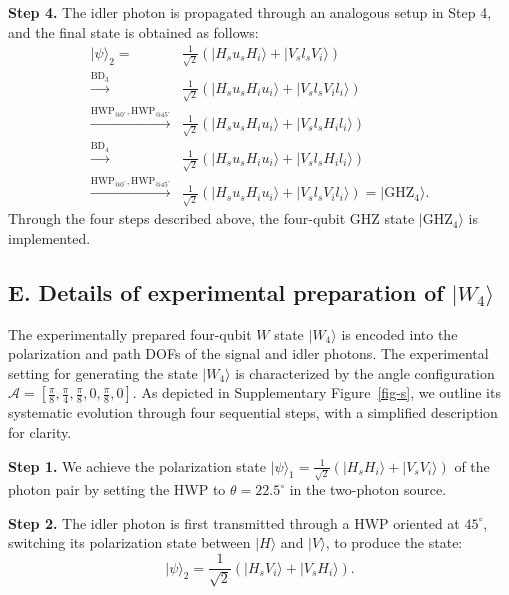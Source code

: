 \documentclass[prl,aps,notitlepage,superscriptaddress,showpacs,nofootinbib]{revtex4-2}
\newcommand{\red}[1]{{\color{red} #1}}
\begin{document}
\textbf{Step 4.} The idler photon is propagated through an analogous setup in Step 4, and the final state is obtained as follows:
\begin{equation}
	\begin{aligned}
		|\psi\rangle_2=&\frac{1}{\sqrt{2}}(|H_su_sH_i\rangle+|V_sl_sV_i\rangle)\\
		\xrightarrow{\text{BD$_3$}} &\frac{1}{\sqrt{2}}(|H_su_sH_iu_i\rangle+|V_sl_sV_il_i\rangle)\\
		\xrightarrow{\text{HWP}_{@0^\circ},\text{HWP}_{@45^\circ}} &\frac{1}{\sqrt{2}}(|H_su_sH_iu_i\rangle+|V_sl_sH_il_i\rangle)\\
		\xrightarrow{\text{BD$_4$}} &\frac{1}{\sqrt{2}}(|H_su_sH_iu_i\rangle+|V_sl_sH_il_i\rangle)\\
		\xrightarrow{\text{HWP}_{@0^\circ},\text{HWP}_{@45^\circ}} &\frac{1}{\sqrt{2}}(|H_su_sH_iu_i\rangle+|V_sl_sV_il_i\rangle)=|\text{GHZ}_4\rangle.
	\end{aligned}
\end{equation}
Through the four steps described above, the four-qubit GHZ state $|\text{GHZ}_4\rangle$ is implemented.


\subsection{E. Details of experimental preparation of  $|W_4\rangle$}

The experimentally prepared four-qubit $W$ state $|W_4\rangle$ is encoded into the polarization and path DOFs of the signal and idler photons. The experimental setting for generating the state $|W_4\rangle$ is characterized by the angle configuration  $\mathcal{A}=[\frac{\pi}{8},\frac{\pi}{4},\frac{\pi}{8},0,\frac{\pi}{8},0]$. As depicted in \red{Supplementary}  Figure~\ref{fig-s}, we outline its systematic evolution through four sequential steps, with a simplified description for clarity.

\textbf{Step 1.} We achieve the polarization state   $|\psi\rangle_1=\frac{1}{\sqrt{2}}(|H_sH_i\rangle+|V_sV_i\rangle)$ of the photon pair by setting the HWP to $\theta=22.5^\circ$ in the two-photon source. 

\textbf{Step 2.} The idler photon is first transmitted through a HWP oriented at $45^\circ$, switching its polarization state between $|H\rangle$ and $|V\rangle$, to produce the state:
\begin{equation}
	|\psi\rangle_2=\frac{1}{\sqrt{2}}(|H_sV_i\rangle+|V_sH_i\rangle).
\end{equation}
\end{document}
